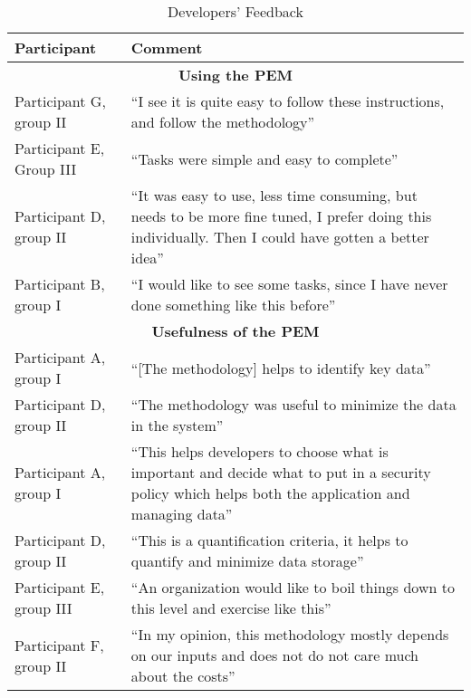 \documentclass{sigchi}
\begin{document}
\begin{center}
\begin{table*}[htbp]
\caption{Developers' Feedback }
\begin{center}
 \begin{tabular}{|m{10em}|m{36em}|} 
 \hline
\textbf{Participant} & \textbf{ Comment } \\
\hline 
 \multicolumn{2}{|c|}{\textbf{Using the PEM}}\\
\hline
Participant G, group II & \enquote{I see it is quite easy to follow these instructions, and follow the methodology}\\
\hline
Participant E, Group III &  \enquote {Tasks were simple and easy to complete}\\
\hline
Participant D, group II & \enquote {It was easy to use, less time consuming, but needs to be more fine tuned, I prefer doing this individually. Then I could have gotten a better idea}\\
\hline
Participant B, group I & \enquote{I would like to see some tasks, since I have never done something like this before}\\
\hline
\multicolumn{2}{|c|}{\textbf{Usefulness of the PEM}}\\
\hline
Participant A, group I &  \enquote{[The methodology] helps to identify key data}\\
\hline
Participant D, group II & \enquote{The methodology was useful to minimize the data in the system}\\
\hline
Participant A, group I & \enquote {This helps developers to choose what is important and decide what to put in a security policy which helps both the application and managing data}\\
\hline
Participant D, group II & \enquote{This is a quantification criteria, it helps to quantify and minimize data storage}\\
\hline
Participant E, group III & \enquote{An organization would like to boil things down to this level and exercise like this}\\
\hline
Participant F, group II & \enquote {In my opinion, this methodology mostly depends on our inputs and does not do not care much about the costs}\\
\hline
\end{tabular}
\end{center}
\end{table*}
\end{center} 
\end{document}
